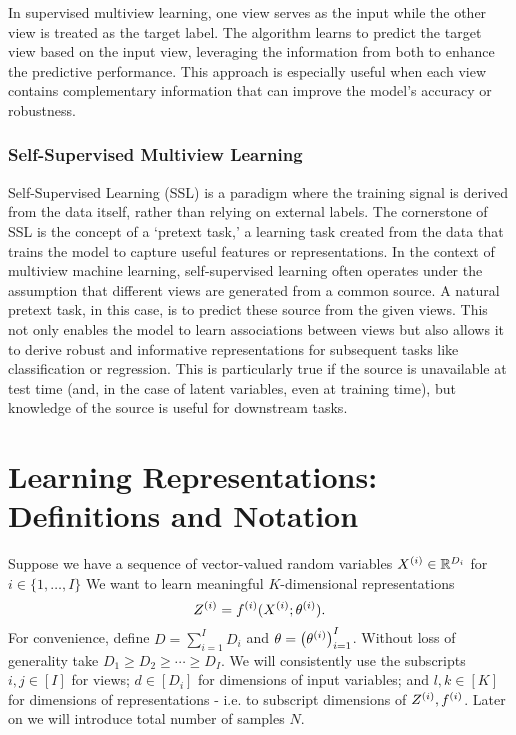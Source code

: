 In supervised multiview learning, one view serves as the input while the other view is treated as the target label.
The algorithm learns to predict the target view based on the input view, leveraging the information from both to enhance the predictive performance.
This approach is especially useful when each view contains complementary information that can improve the model's accuracy or robustness.

\subsubsection{Self-Supervised Multiview Learning}

Self-Supervised Learning (SSL) is a paradigm where the training signal is derived from the data itself, rather than relying on external labels.
The cornerstone of SSL is the concept of a `pretext task,' a learning task created from the data that trains the model to capture useful features or representations.
In the context of multiview machine learning, self-supervised learning often operates under the assumption that different \gls{views} are generated from a common source.
A natural pretext task, in this case, is to predict these source from the given \gls{views}.
This not only enables the model to learn associations between \gls{views} but also allows it to derive robust and informative representations for subsequent tasks like classification or regression.
This is particularly true if the source is unavailable at test time (and, in the case of latent variables, even at training time), but knowledge of the source is useful for downstream tasks.

\section{Learning Representations: Definitions and Notation}

Suppose we have a sequence of vector-valued random variables $X^{(i)} \in \mathbb{R}^{D_i}$ for $i \in \{1, \dots, I \}$
We want to learn meaningful $K$-dimensional representations
\begin{equation}\label{eq:general-form-of-representations}
    Z^{(i)} = f^{(i)}( X^{(i)}; \theta^{(i)}).
\end{equation}
For convenience, define $D = \sum_{i=1}^I D_i$ and $\theta = \left(\theta^{(i)}\right)_{i=1}^I$.
Without loss of generality take $D_1 \geq D_2 \geq \cdots \geq D_I$.
We will consistently use the subscripts $i,j \in [I]$ for \gls{views};
$d \in [D_i]$ for dimensions of input variables;
and $l,k \in [K]$ for dimensions of representations - i.e. to subscript dimensions of $Z^{(i)}, f^{(i)}$.
Later on we will introduce total number of samples $N$.

